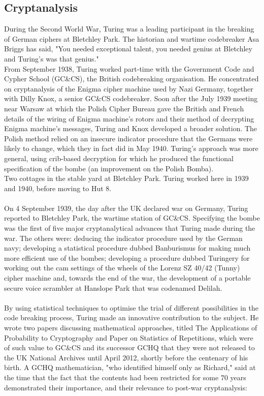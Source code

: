 \documentclass{article}
\begin{document}
\subsection{Cryptanalysis}

During the Second World War, Turing was a leading participant in the breaking of German ciphers at Bletchley Park. The historian and wartime codebreaker Asa Briggs has said, "You needed exceptional talent, you needed genius at Bletchley and Turing's was that genius."\\
From September 1938, Turing worked part-time with the Government Code and Cypher School (GC\&CS), the British codebreaking organisation. He concentrated on cryptanalysis of the Enigma cipher machine used by Nazi Germany, together with Dilly Knox, a senior GC\&CS codebreaker. Soon after the July 1939 meeting near Warsaw at which the Polish Cipher Bureau gave the British and French details of the wiring of Enigma machine's rotors and their method of decrypting Enigma machine's messages, Turing and Knox developed a broader solution. The Polish method relied on an insecure indicator procedure that the Germans were likely to change, which they in fact did in May 1940. Turing's approach was more general, using crib-based decryption for which he produced the functional specification of the bombe (an improvement on the Polish Bomba).\\
Two cottages in the stable yard at Bletchley Park. Turing worked here in 1939 and 1940, before moving to Hut 8.\\
\\
On 4 September 1939, the day after the UK declared war on Germany, Turing reported to Bletchley Park, the wartime station of GC\&CS. Specifying the bombe was the first of five major cryptanalytical advances that Turing made during the war. The others were: deducing the indicator procedure used by the German navy; developing a statistical procedure dubbed Banburismus for making much more efficient use of the bombes; developing a procedure dubbed Turingery for working out the cam settings of the wheels of the Lorenz SZ 40/42 (Tunny) cipher machine and, towards the end of the war, the development of a portable secure voice scrambler at Hanslope Park that was codenamed Delilah.\\
\\
By using statistical techniques to optimise the trial of different possibilities in the code breaking process, Turing made an innovative contribution to the subject. He wrote two papers discussing mathematical approaches, titled The Applications of Probability to Cryptography and Paper on Statistics of Repetitions, which were of such value to GC\&CS and its successor GCHQ that they were not released to the UK National Archives until April 2012, shortly before the centenary of his birth. A GCHQ mathematician, "who identified himself only as Richard," said at the time that the fact that the contents had been restricted for some 70 years demonstrated their importance, and their relevance to post-war cryptanalysis:\\
\end{document}
